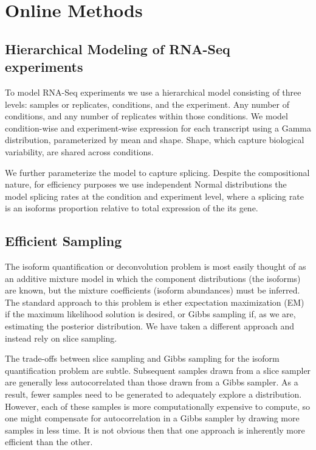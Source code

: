 \documentclass[twocolumn]{article}
\begin{document}
\section{Online Methods}\label{online-methods}

\subsection{Hierarchical Modeling of RNA-Seq
experiments}\label{hierarchical-modeling-of-rna-seq-experiments}

To model RNA-Seq experiments we use a hierarchical model consisting of
three levels: samples or replicates, conditions, and the experiment. Any
number of conditions, and any number of replicates within those
conditions. We model condition-wise and experiment-wise expression for
each transcript using a Gamma distribution, parameterized by mean and
shape. Shape, which capture biological variability, are shared across
conditions.

We further parameterize the model to capture splicing. Despite the
compositional nature, for efficiency purposes we use independent Normal
distributions the model splicing rates at the condition and experiment
level, where a splicing rate is an isoforms proportion relative to total
expression of the its gene.

\subsection{Efficient Sampling}\label{efficient-sampling}

The isoform quantification or deconvolution problem is most easily
thought of as an additive mixture model in which the component
distributions (the isoforms) are known, but the mixture coefficients
(isoform abundances) must be inferred. The standard approach to this
problem is ether expectation maximization (EM) if the maximum likelihood
solution is desired, or Gibbs sampling if, as we are, estimating the
posterior distribution. We have taken a different approach and instead
rely on slice sampling.

The trade-offs between slice sampling and Gibbs sampling for the isoform
quantification problem are subtle. Subsequent samples drawn from a slice
sampler are generally less autocorrelated than those drawn from a Gibbs
sampler. As a result, fewer samples need to be generated to adequately
explore a distribution. However, each of these samples is more
computationally expensive to compute, so one might compensate for
autocorrelation in a Gibbs sampler by drawing more samples in less time.
It is not obvious then that one approach is inherently more efficient
than the other.
\end{document}
